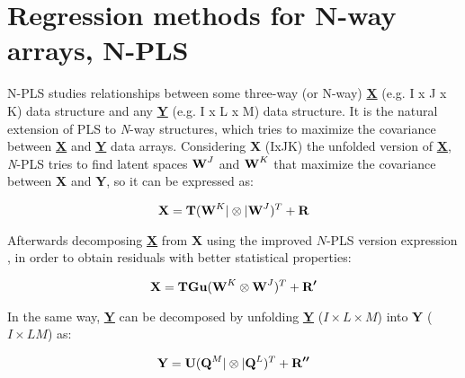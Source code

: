 \section{Regression methods for N-way arrays, N-PLS}
\label{NPLSregression}
N-PLS studies relationships between some three-way (or N-way) \textbf{\underline{X}} (e.g. I x J x K) data structure and any \textbf{\underline{Y}} (e.g. I x L x M) data structure. It is the natural extension of PLS to \textit{N}-way structures, which tries to maximize the covariance between \textbf{\underline{X}} and \textbf{\underline{Y}} data arrays. Considering \textbf{X} (IxJK) the unfolded version of \textbf{\underline{X}}, \textit{N}-PLS tries to find latent spaces $\textbf{\text{W}}^{J}$ and $\textbf{\text{W}}^{K}$ that maximize the covariance between \textbf{X} and \textbf{Y}, so it can be expressed as:

\begin{equation}
\textbf{\text{X}}=\textbf{\text{T}}(\textbf{\text{W}}^{K}|\otimes{}|\textbf{\text{W}}^{J})^{T}+\textbf{\text{R}}
\label{equation01}
\end{equation}

Afterwards decomposing \textbf{\underline{X}} from \textbf{X} using the improved $N$-PLS version expression \parencite{bro2001difference}, in order to obtain residuals with better statistical properties:

\begin{equation}
\textbf{\text{X}}=\textbf{\text{T}}\textbf{\text{Gu}}(\textbf{\text{W}}^{K}\otimes{}\textbf{\text{W}}^{J})^{T}+\textbf{\text{R}}^{\boldsymbol{\prime{}}}
\label{equation02}
\end{equation}

In the same way, \textbf{\underline{Y}} can be decomposed by unfolding \textbf{\underline{Y}} ($I \times L \times M$) into \textbf{Y} ($I \times LM$) as:

\begin{equation}
\textbf{\text{Y}}=\textbf{\text{U}}(\textbf{\text{Q}}^{M}|\otimes{}|\textbf{\text{Q}}^{L})^{T}+\textbf{\text{R}}^{\boldsymbol{\prime{}\prime{}}}
\label{equation03}
\end{equation}

